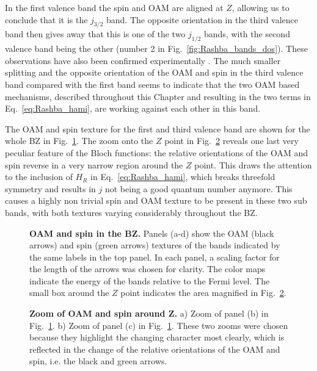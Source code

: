 In the first valence band the spin and OAM are aligned at $Z$, allowing us to conclude that it is the $j_{3/2}$ band. The opposite orientation in the third valence band then gives away that this is one of the two $j_{1/2}$ bands, with the second valence band being the other (number 2 in Fig.~\ref{fig:Rashba_bands_dos}).
These observations have also been confirmed experimentally \cite{Krempasky2015,Krempasky2020}.
The much smaller splitting and the opposite orientation of the OAM and spin in the third valence band compared with the first band seems to indicate that the two OAM based mechanisms, described throughout this Chapter and resulting in the two terms in Eq.~\eqref{eq:Rashba_hami}, are working against each other in this band.

The OAM and spin texture for the first and third valence band are shown for the whole BZ in Fig.~\ref{fig:Rashba_textures}.
The zoom onto the $Z$ point in Fig.~\ref{fig:Rashba_textures_small} reveals one last very peculiar feature of the Bloch functions: the relative orientations of the OAM and spin reverse in a very narrow region around the $Z$ point.
This draws the attention to the inclusion of $H_R$ in Eq.~\eqref{eq:Rashba_hami}, which breaks threefold symmetry and results in $j$ not being a good quantum number anymore. This causes a highly non trivial spin and OAM texture to be present in these two sub bands, with both textures varying considerably throughout the BZ. 



\begin{figure}
	\centering
  \caption{\label{fig:Rashba_textures}{\bf OAM and spin in the BZ.} Panels (a-d) show the OAM (black arrows) and spin (green arrows) textures of the bands indicated by the same labels in the top panel. In each panel, a scaling factor for the length of the arrows was chosen for clarity. The color maps indicate the energy of the bands relative to the Fermi level. The small box around the $Z$ point indicates the area magnified in Fig.~\ref{fig:Rashba_textures_small}.}
\end{figure}
\begin{figure}
	\centering
  \caption{\label{fig:Rashba_textures_small}{\bf Zoom of OAM and spin around Z.} a) Zoom of panel (b) in Fig.~\ref{fig:Rashba_textures}. b) Zoom of panel (c) in Fig.~\ref{fig:Rashba_textures}.  These two zooms were chosen because they highlight the changing character most clearly, which is reflected in the change of the relative orientations of the OAM and spin, i.e. the black and green arrows.}
\end{figure}

